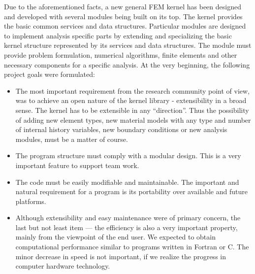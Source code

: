 \begin{htmlonly}
\begin{center}
Due to the aforementioned facts, a new general FEM kernel has been designed and developed 
with several modules being built on its top.
The kernel provides the basic common services and data
structures. 
Particular modules are designed to implement analysis specific parts by extending
and specializing the basic kernel structure represented by its
services and data structures. The module must provide problem
formulation, numerical algorithms, finite elements and other
necessary components for a specific analysis.
At the very beginning, the following project goals were formulated:
\begin{itemize}
\item
The most important requirement from the research community point of view, was to
achieve an open nature of the kernel library - extensibility in a broad sense. The
kernel has to be extensible in
any ``direction''. Thus the possibility of adding new element types, new
material models with any type and number of internal history variables,
new boundary conditions or new analysis modules, must be a matter of
course. 
\item
The program structure must comply with a modular design. This
is a very important feature to support team work. 
\item
The code must be easily modifiable and maintainable. The important and
natural requirement for a program is its portability over available
and future platforms.
\item
Although extensibility and easy maintenance were of primary concern,
the last but not least item --- the efficiency is also a very
important property, mainly from the viewpoint of the end user. We expected
to obtain computational performance similar to programs
written in Fortran or C. The minor decrease in speed is not 
important, if we realize the progress in computer hardware technology.
\end{itemize}



\end{center}
\end{htmlonly}

